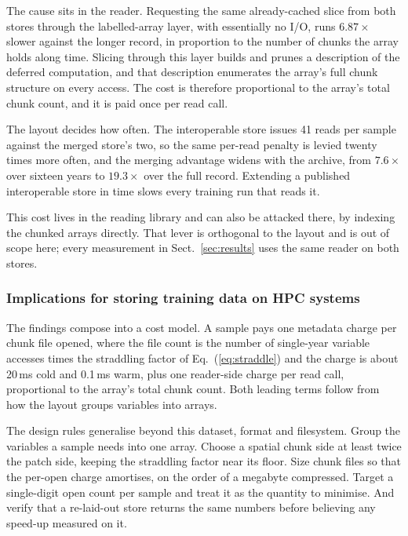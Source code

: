 \documentclass[gmd, manuscript]{copernicus}
\begin{document}
The cause sits in the reader. Requesting the same already-cached slice from both stores through
the labelled-array layer, with essentially no I/O, runs $6.87\times$ slower against the longer
record, in proportion to the number of chunks the array holds along time. Slicing through this
layer builds and prunes a description of the deferred computation, and that description
enumerates the array's full chunk structure on every access. The cost is therefore proportional
to the array's total chunk count, and it is paid once per read call.

The layout decides how often. The interoperable store issues 41 reads per sample against the
merged store's two, so the same per-read penalty is levied twenty times more often, and the
merging advantage widens with the archive, from $7.6\times$ over sixteen years to
$19.3\times$ over the full record. Extending a published interoperable store in time slows
every training run that reads it.

This cost lives in the reading library and can also be attacked there, by indexing the chunked
arrays directly. That lever is orthogonal to the layout and is out of scope here; every
measurement in Sect.~\ref{sec:results} uses the same reader on both stores.

\subsubsection{Implications for storing training data on HPC systems}
\label{sec:finding-principle}

The findings compose into a cost model. A sample pays one metadata charge per chunk file
opened, where the file count is the number of single-year variable accesses times the
straddling factor of Eq.~(\ref{eq:straddle}) and the charge is about 20\,ms cold and 0.1\,ms
warm, plus one reader-side charge per read call, proportional to the array's total chunk count.
Both leading terms follow from how the layout groups variables into arrays.

The design rules generalise beyond this dataset, format and filesystem. Group the variables a
sample needs into one array. Choose a spatial chunk side at least twice the patch side, keeping
the straddling factor near its floor. Size chunk files so that the per-open charge amortises,
on the order of a megabyte compressed. Target a single-digit open count per sample and treat it
as the quantity to minimise. And verify that a re-laid-out store returns the same numbers
before believing any speed-up measured on it.
\end{document}
